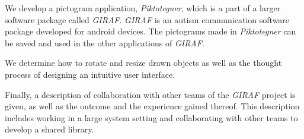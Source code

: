 We develop a pictogram application, \textit{Piktotegner}, which is a part of a larger software package called \textit{GIRAF}.
\textit{GIRAF} is an autism communication software package developed for android devices.
The pictograms made in \textit{Piktotegner} can be saved and used in the other applications of \textit{GIRAF}.

We determine how to rotate and resize drawn objects as well as the thought process of designing an intuitive user interface.

Finally, a description of collaboration with other teams of the \textit{GIRAF} project is given, as well as the outcome and the experience gained thereof.
This description includes working in a large system setting and collaborating with other teams to develop a shared library.